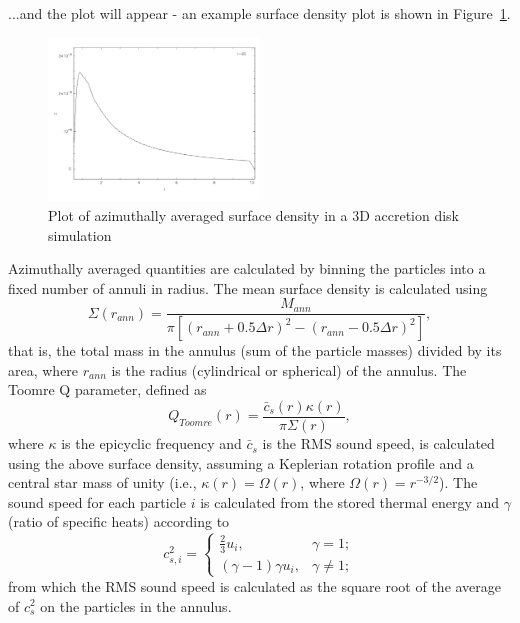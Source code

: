 \documentclass[a4paper,10pt]{article}
\begin{document}
...and the plot will appear - an example surface density plot is shown in Figure~\ref{fig:surfdens}.
\begin{figure}[h!]
\begin{center}
\includegraphics[width=0.5\textwidth]{surfdens.pdf}
\caption{Plot of azimuthally averaged surface density in a 3D accretion disk simulation}
\label{fig:surfdens}
\end{center}
\end{figure}

Azimuthally averaged quantities are calculated by binning the particles into a fixed number of annuli in radius. The mean surface density is calculated using
\begin{equation}
\Sigma(r_{ann}) = \frac{M_{ann}}{\pi [(r_{ann} + 0.5\Delta r)^{2} - (r_{ann} - 0.5\Delta r)^{2}]},
\end{equation}
that is, the total mass in the annulus (sum of the particle masses) divided by its area, where $r_{ann}$ is the radius (cylindrical or spherical) of the annulus. The Toomre Q parameter, defined as
\begin{equation}
Q_{Toomre}(r) = \frac{\bar{c}_{s}(r)\kappa(r)}{\pi \Sigma(r)},
\end{equation}
where $\kappa$ is the epicyclic frequency and $\bar{c}_{s}$ is the RMS sound speed, is calculated using the above surface density, assuming a Keplerian rotation profile and a central star mass of unity (i.e.,  $\kappa(r) = \Omega(r)$, where $\Omega(r) = r^{-3/2}$). The sound speed for each particle $i$ is calculated from the stored thermal energy and $\gamma$ (ratio of specific heats) according to
\begin{equation}
c_{s,i}^{2} = \left\{ \begin{array}{ll}
\frac23 u_{i}, & \gamma = 1; \\
(\gamma-1)\gamma u_i, & \gamma \neq 1; 
\end{array}\right.
\end{equation}
from which the RMS sound speed is calculated as the square root of the average of $c_{s}^{2}$ on the particles in the annulus.
\end{document}
